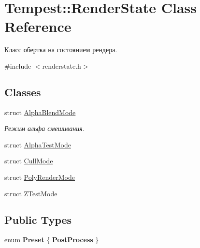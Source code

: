 \hypertarget{class_tempest_1_1_render_state}{\section{Tempest\+:\+:Render\+State Class Reference}
\label{class_tempest_1_1_render_state}
}


Класс обертка на состоянием рендера.  




{\ttfamily \#include $<$renderstate.\+h$>$}

\subsection*{Classes}
\begin{DoxyCompactItemize}
\item 
struct \hyperlink{struct_tempest_1_1_render_state_1_1_alpha_blend_mode}{Alpha\+Blend\+Mode}
\begin{DoxyCompactList}\small\item\em Режим альфа смешивания. \end{DoxyCompactList}\item 
struct \hyperlink{struct_tempest_1_1_render_state_1_1_alpha_test_mode}{Alpha\+Test\+Mode}
\item 
struct \hyperlink{struct_tempest_1_1_render_state_1_1_cull_mode}{Cull\+Mode}
\item 
struct \hyperlink{struct_tempest_1_1_render_state_1_1_poly_render_mode}{Poly\+Render\+Mode}
\item 
struct \hyperlink{struct_tempest_1_1_render_state_1_1_z_test_mode}{Z\+Test\+Mode}
\end{DoxyCompactItemize}
\subsection*{Public Types}
\begin{DoxyCompactItemize}
\item 
\hypertarget{class_tempest_1_1_render_state_aceca132dcff2492d9a39929263ab7817}{enum {\bfseries Preset} \{ {\bfseries Post\+Process}
 \}}\label{class_tempest_1_1_render_state_aceca132dcff2492d9a39929263ab7817}

\end{DoxyCompactItemize}
